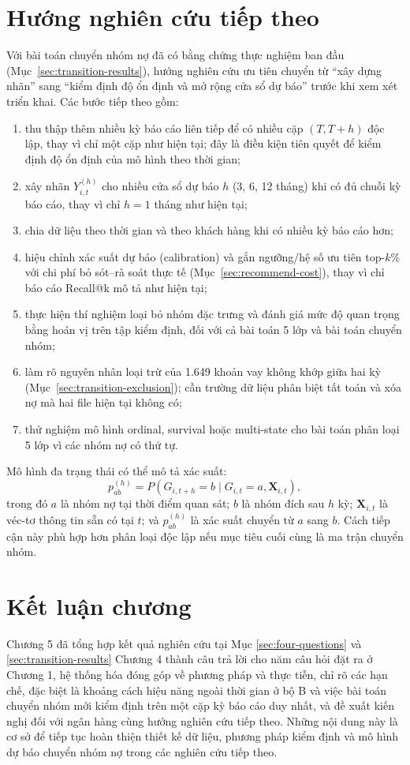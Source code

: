 \section{Hướng nghiên cứu tiếp theo}

Với bài toán chuyển nhóm nợ đã có bằng chứng thực nghiệm ban đầu (Mục~\ref{sec:transition-results}), hướng nghiên cứu ưu tiên chuyển từ ``xây dựng nhãn'' sang ``kiểm định độ ổn định và mở rộng cửa sổ dự báo'' trước khi xem xét triển khai. Các bước tiếp theo gồm:

\begin{enumerate}
    \item thu thập thêm nhiều kỳ báo cáo liên tiếp để có nhiều cặp $(T,T+h)$ độc lập, thay vì chỉ một cặp như hiện tại; đây là điều kiện tiên quyết để kiểm định độ ổn định của mô hình theo thời gian;
    \item xây nhãn $Y_{i,t}^{(h)}$ cho nhiều cửa sổ dự báo $h$ (3, 6, 12 tháng) khi có đủ chuỗi kỳ báo cáo, thay vì chỉ $h=1$ tháng như hiện tại;
    \item chia dữ liệu theo thời gian và theo khách hàng khi có nhiều kỳ báo cáo hơn;
    \item hiệu chỉnh xác suất dự báo (calibration) và gắn ngưỡng/hệ số ưu tiên top-$k$\% với chi phí bỏ sót--rà soát thực tế (Mục~\ref{sec:recommend-cost}), thay vì chỉ báo cáo Recall@k mô tả như hiện tại;
    \item thực hiện thí nghiệm loại bỏ nhóm đặc trưng và đánh giá mức độ quan trọng bằng hoán vị trên tập kiểm định, đối với cả bài toán 5 lớp và bài toán chuyển nhóm;
    \item làm rõ nguyên nhân loại trừ của 1.649 khoản vay không khớp giữa hai kỳ (Mục~\ref{sec:transition-exclusion}); cần trường dữ liệu phân biệt tất toán và xóa nợ mà hai file hiện tại không có;
    \item thử nghiệm mô hình ordinal, survival hoặc multi-state cho bài toán phân loại 5 lớp vì các nhóm nợ có thứ tự.
\end{enumerate}

Mô hình đa trạng thái có thể mô tả xác suất:
\[
p_{ab}^{(h)}
=P(G_{i,t+h}=b\mid G_{i,t}=a,\mathbf{X}_{i,t}),
\]
trong đó $a$ là nhóm nợ tại thời điểm quan sát; $b$ là nhóm đích sau $h$ kỳ; $\mathbf{X}_{i,t}$ là véc-tơ thông tin sẵn có tại $t$; và $p_{ab}^{(h)}$ là xác suất chuyển từ $a$ sang $b$. Cách tiếp cận này phù hợp hơn phân loại độc lập nếu mục tiêu cuối cùng là ma trận chuyển nhóm.

\section{Kết luận chương}

Chương 5 đã tổng hợp kết quả nghiên cứu tại Mục \ref{sec:four-questions} và \ref{sec:transition-results} Chương 4 thành câu trả lời cho năm câu hỏi đặt ra ở Chương 1, hệ thống hóa đóng góp về phương pháp và thực tiễn, chỉ rõ các hạn chế, đặc biệt là khoảng cách hiệu năng ngoài thời gian ở bộ B và việc bài toán chuyển nhóm mới kiểm định trên một cặp kỳ báo cáo duy nhất, và đề xuất kiến nghị đối với ngân hàng cùng hướng nghiên cứu tiếp theo. Những nội dung này là cơ sở để tiếp tục hoàn thiện thiết kế dữ liệu, phương pháp kiểm định và mô hình dự báo chuyển nhóm nợ trong các nghiên cứu tiếp theo.
